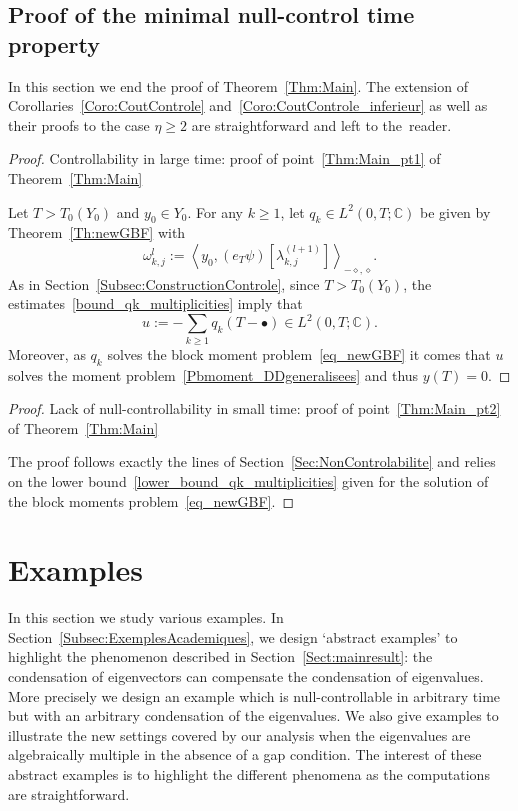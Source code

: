 \documentclass[AHL,Unicode,longabstracts]{cedram}
\newcommand{\Fzp}{Y_0}
\newcommand{\dual}[2]{\left\langle #1, #2 \right\rangle_{-\diamond,\diamond}}
\newcommand{\C}{\mathbb{C}}
\renewcommand{\cdot}{{\scriptstyle \bullet}}
\begin{document}
\subsection{Proof of the minimal null-control time property} \label{Subsec:NC_DDgeneralisees}


In this section we end the proof of Theorem~\ref{Thm:Main}. The extension of Corollaries~\ref{Coro:CoutControle} and~\ref{Coro:CoutControle_inferieur} as well as their proofs to the case $\eta \geq 2$ are straightforward and left to the~reader.

\begin{proof}{Controllability in large time: proof of point~\eqref{Thm:Main_pt1} of Theorem~\ref{Thm:Main}}


Let $T> T_0(\Fzp)$ and $y_0 \in \Fzp$. For any $k \geq 1$, let $q_k \in L^2(0,T ; \C)$ be given by Theorem~\ref{Th:newGBF} with
\[
\omega_{k,j}^l := \dual{y_0}{(e_T \psi) [\lambda_{k,j}^{(l+1)}] }.
\]
As in Section~\ref{Subsec:ConstructionControle}, since $T >T_0(\Fzp)$, the estimates~\eqref{bound_qk_multiplicities} imply that
\[
u := -\sum_{k \geq 1} q_k (T-\cdot) \in L^2(0,T ; \C).
\]
Moreover, as $q_k$ solves the block moment problem~\eqref{eq_newGBF} it comes that $u$ solves the moment problem~\eqref{Pbmoment_DDgeneralisees} and thus $y(T)=0$.
\end{proof}



\begin{proof}{Lack of null-controllability in small time: proof of point~\eqref{Thm:Main_pt2} of Theorem~\ref{Thm:Main}}

The proof follows exactly the lines of Section~\ref{Sec:NonControlabilite} and relies on the lower bound~\eqref{lower_bound_qk_multiplicities} given for the solution of the block moments problem~\eqref{eq_newGBF}.
\end{proof}



\section{Examples}\label{Sec:Examples}

In this section we study various examples. In Section~\ref{Subsec:ExemplesAcademiques}, we design `abstract examples' to highlight the phenomenon described in Section~\ref{Sect:mainresult}: the condensation of eigenvectors can compensate the condensation of eigenvalues. More precisely we design an example which is null-controllable in arbitrary time but with an arbitrary condensation of the eigenvalues. We also give examples to illustrate the new settings covered by our analysis when the eigenvalues are algebraically multiple in the absence of a gap condition. The interest of these abstract examples is to highlight the different phenomena as the computations are straightforward.
\end{document}
